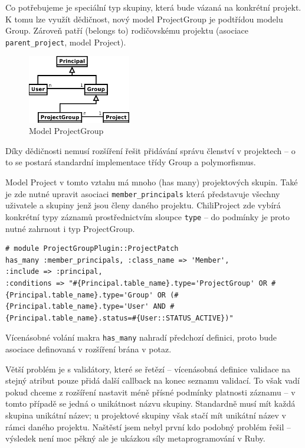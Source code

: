 \documentclass[thesis=B,czech]{FITthesis}[2012/05/02]
\begin{document}
Co potřebujeme je speciální typ skupiny, která bude vázaná na konkrétní
projekt. K tomu lze využít dědičnost, nový model ProjectGroup je
podtřídou modelu Group. Zároveň patří (belongs to) rodičovskému projektu
(asociace \lstinline!parent_project!, model Project).

\begin{figure}[bp]
\centering
\includegraphics[width=0.4\textwidth]{group-er3.pdf}
\caption{Model ProjectGroup}
\end{figure}

Díky dědičnosti nemusí rozšíření řešit přidávání správu členství
v projektech -- o to se postará standardní implementace třídy Group a
polymorfismus.

Model Project v tomto vztahu má mnoho (has many) projektových skupin.
Také je zde nutné upravit asociaci \lstinline!member_principals! která
představuje všechny uživatele a skupiny jenž jsou členy daného projektu.
ChiliProject zde vybírá konkrétní typy záznamů prostřednictvím sloupce
\lstinline!type! -- do podmínky je proto nutné zahrnout i typ
ProjectGroup.

\begin{lstlisting}
# module ProjectGroupPlugin::ProjectPatch
has_many :member_principals, :class_name => 'Member',
:include => :principal,
:conditions => "#{Principal.table_name}.type='ProjectGroup' OR #{Principal.table_name}.type='Group' OR (#{Principal.table_name}.type='User' AND #{Principal.table_name}.status=#{User::STATUS_ACTIVE})"
\end{lstlisting}
Vícenásobné volání makra \lstinline!has_many! nahradí předchozí
definici, proto bude asociace definovaná v rozšíření brána v potaz.

Větší problém je s validátory, které se řetězí -- vícenásobná definice
validace na stejný atribut pouze přidá další \gls{callback} na konec
seznamu validací. To však vadí pokud chceme z rozšíření nastavit méně
přísné podmínky platnosti záznamu -- v tomto případě se jedná
o unikátnost názvu skupiny. Standardně musí mít každá skupina unikátní
název; u projektové skupiny však stačí mít unikátní název v rámci daného
projektu. Naštěstí jsem nebyl první kdo podobný problém řešil
\citep{McAlpin2011} -- výsledek není moc pěkný ale je ukázkou síly
metaprogramování v Ruby.
\end{document}
